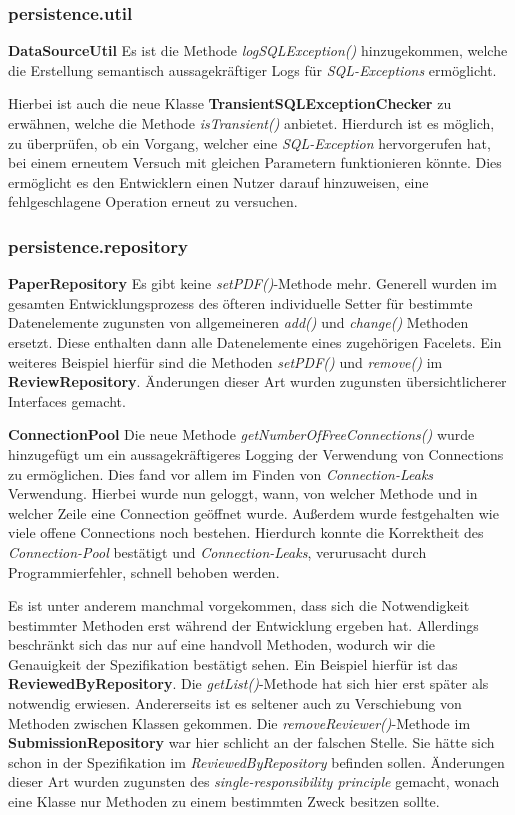 \subsubsection{persistence.util}

\textbf{DataSourceUtil} Es ist die Methode \emph{logSQLException()} hinzugekommen, welche die Erstellung
semantisch aussagekräftiger Logs für \emph{SQL-Exceptions} ermöglicht.

Hierbei ist auch die neue Klasse \textbf{TransientSQLExceptionChecker} zu erwähnen, welche
die Methode \emph{isTransient()} anbietet.
Hierdurch ist es möglich, zu überprüfen, ob ein Vorgang,
welcher eine \emph{SQL-Exception} hervorgerufen hat, bei einem erneutem Versuch
mit gleichen Parametern funktionieren könnte.
Dies ermöglicht es den Entwicklern einen Nutzer darauf hinzuweisen,
eine fehlgeschlagene Operation erneut zu versuchen.

\subsubsection{persistence.repository}

\textbf{PaperRepository} Es gibt keine \emph{setPDF()}-Methode mehr.
Generell wurden im gesamten Entwicklungsprozess des öfteren individuelle Setter für
bestimmte Datenelemente zugunsten von allgemeineren \emph{add()} und \emph{change()} Methoden ersetzt.
Diese enthalten dann alle Datenelemente eines zugehörigen Facelets.
Ein weiteres Beispiel hierfür sind die Methoden \emph{setPDF()} und \emph{remove()}
im \textbf{ReviewRepository}.
Änderungen dieser Art wurden zugunsten übersichtlicherer Interfaces gemacht.

\textbf{ConnectionPool} Die neue Methode \emph{getNumberOfFreeConnections()}
wurde hinzugefügt um ein aussagekräftigeres Logging der Verwendung von Connections
zu ermöglichen.
Dies fand vor allem im Finden von \emph{Connection-Leaks} Verwendung.
Hierbei wurde nun geloggt, wann, von welcher Methode und in welcher Zeile eine
Connection geöffnet wurde.
Außerdem wurde festgehalten wie viele offene Connections noch bestehen.
Hierdurch konnte die Korrektheit des \emph{Connection-Pool} bestätigt
und \emph{Connection-Leaks}, verurusacht durch Programmierfehler,
schnell behoben werden.

Es ist unter anderem manchmal vorgekommen, dass sich die Notwendigkeit bestimmter
Methoden erst während der Entwicklung ergeben hat.
Allerdings beschränkt sich das nur auf eine handvoll Methoden, wodurch wir die Genauigkeit der Spezifikation bestätigt
sehen.
Ein Beispiel hierfür ist das \textbf{ReviewedByRepository}.
Die \emph{getList()}-Methode hat sich hier erst später als notwendig erwiesen.
Andererseits ist es seltener auch zu Verschiebung von Methoden zwischen Klassen gekommen.
Die \emph{removeReviewer()}-Methode im \textbf{SubmissionRepository}  war hier schlicht an
der falschen Stelle.
Sie hätte sich schon in der Spezifikation im \emph{ReviewedByRepository} befinden sollen.
Änderungen dieser Art wurden zugunsten des \emph{single-responsibility principle} gemacht,
wonach eine Klasse nur Methoden zu einem bestimmten Zweck besitzen sollte.

